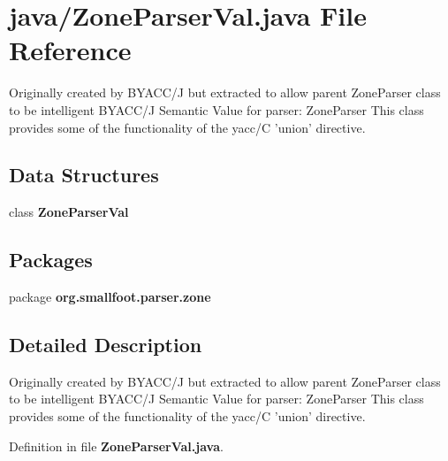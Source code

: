 \section{java/\+Zone\+Parser\+Val.java File Reference}
\label{ZoneParserVal_8java}


Originally created by B\+Y\+A\+C\+C/\+J but extracted to allow parent Zone\+Parser class to be intelligent B\+Y\+A\+C\+C/\+J Semantic Value for parser\+: Zone\+Parser This class provides some of the functionality of the yacc/\+C 'union' directive.  


\subsection*{Data Structures}
\begin{DoxyCompactItemize}
\item 
class {\bf Zone\+Parser\+Val}
\end{DoxyCompactItemize}
\subsection*{Packages}
\begin{DoxyCompactItemize}
\item 
package {\bf org.\+smallfoot.\+parser.\+zone}
\end{DoxyCompactItemize}


\subsection{Detailed Description}
Originally created by B\+Y\+A\+C\+C/\+J but extracted to allow parent Zone\+Parser class to be intelligent B\+Y\+A\+C\+C/\+J Semantic Value for parser\+: Zone\+Parser This class provides some of the functionality of the yacc/\+C 'union' directive. 



Definition in file {\bf Zone\+Parser\+Val.\+java}.

